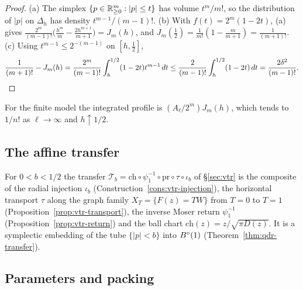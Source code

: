 \begin{proof}
(a) The simplex $\{p\in\mathbb{R}^m_{\ge0}:|p|\le t\}$ has volume $t^m/m!$, so the distribution of $|p|$ on $\Delta_h$ has density
$t^{m-1}/(m-1)!$. (b) With $f(t)=2^m(1-2t)$, (a) gives $\frac{2^m}{(m-1)!}\bigl(\frac{h^m}m-\frac{2h^{m+1}}{m+1}\bigr)=J_m(h)$, and
$J_m(\frac12)=\frac1{m!}(1-\frac m{m+1})=\frac1{(m+1)!}$. (c) Using $t^{m-1}\le2^{-(m-1)}$ on $[h,\frac12]$,
\[
 \frac1{(m+1)!}-J_m(h)=\frac{2^m}{(m-1)!}\int_h^{1/2}(1-2t)t^{m-1}\,dt\le\frac{2}{(m-1)!}\int_h^{1/2}(1-2t)\,dt=\frac{2\delta^2}{(m-1)!}.
 \qedhere
\]
\end{proof}


For the finite model the integrated profile is $(A_\ell/2^m)J_m(h)$, which tends to $1/n!$ as $\ell\to\infty$ and $h\uparrow1/2$.

\subsection{The affine transfer}

For $0<b<1/2$ the transfer $\mathcal T_b=\mathrm{ch}\circ\psi_1^{-1}\circ\mathrm{pr}\circ\tau\circ\iota_b$ of \S\ref{sec:vtr} is the
composite of the radial injection $\iota_b$ (Construction~\ref{cons:vtr-injection}), the horizontal transport $\tau$ along the graph
family $X_T=\{F(z)=TW\}$ from $T=0$ to $T=1$ (Proposition~\ref{prop:vtr-transport}), the inverse Moser return $\psi_1^{-1}$
(Proposition~\ref{prop:vtr-return}) and the ball chart $\mathrm{ch}(z)=z/\sqrt{\pi D(z)}$. It is a symplectic embedding of the tube
$\{|p|<b\}$ into $B^{\circ}(1)$ (Theorem~\ref{thm:qdr-transfer}).

\subsection{Parameters and packing}

